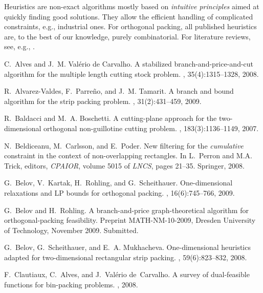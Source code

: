 \documentclass[a4paper,12pt]{article}
\begin{document}
Heuristics are non-exact algorithms mostly based on \emph{intuitive principles} aimed at quickly finding good solutions. They allow the efficient handling of complicated constraints, e.g., industrial ones.
For orthogonal packing, all published heuristics are, to the best of our knowledge, purely combinatorial. For literature reviews, see, e.g., \cite{Egeblad09,BSM-SVC2,GRASPbpp}.

\begin{thebibliography}{10}

C.~Alves and J.~M. {Val\'erio de Carvalho}.
\newblock A stabilized branch-and-price-and-cut algorithm for the multiple
  length cutting stock problem.
, 35(4):1315--1328, 2008.

R.~Alvarez-Valdes, F.~Parre{\~n}o, and J.~M. Tamarit.
\newblock A branch and bound algorithm for the strip packing problem.
, 31(2):431--459, 2009.

R.~Baldacci and M.~A. Boschetti.
\newblock A cutting-plane approach for the two-dimensional orthogonal
  non-guillotine cutting problem.
, 183(3):1136--1149,
  2007.

N.~Beldiceanu, M.~Carlsson, and E.~Poder.
\newblock New filtering for the \emph{cumulative} constraint in the context of
  non-overlapping rectangles.
\newblock In L.~Perron and M.A. Trick, editors, {\em CPAIOR}, volume 5015 of
  {\em LNCS}, pages 21--35. Springer, 2008.

G.~Belov, V.~Kartak, H.~Rohling, and G.~Scheithauer.
\newblock One-dimensional relaxations and {LP} bounds for orthogonal packing.
,
  16(6):745--766, 2009.

G.~Belov and H.~Rohling.
\newblock A branch-and-price graph-theoretical algorithm for orthogonal-packing
  feasibility.
\newblock Preprint MATH-NM-10-2009, Dresden University of Technology, November
  2009.
\newblock Submitted.

G.~Belov, G.~Scheithauer, and E.~A. Mukhacheva.
\newblock One-dimensional heuristics adapted for two-dimensional rectangular
  strip packing.
, 59(6):823--832,
  2008.

F.~Clautiaux, C.~Alves, and J.~Val{\'e}rio de~Carvalho.
\newblock A survey of dual-feasible functions for bin-packing problems.
, 2008.


\end{thebibliography}
\end{document}

